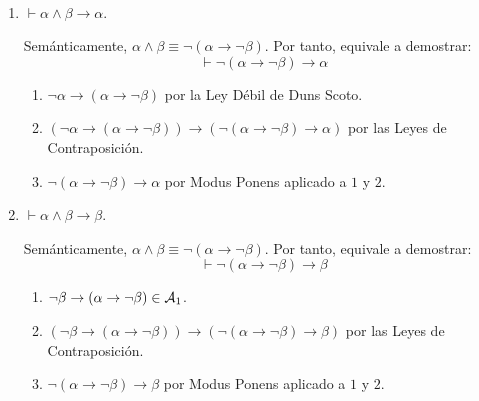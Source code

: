 \begin{ejercicio}\label{ej:1.22}~
    \begin{enumerate}
        \item $\vdash \alpha \land \beta \rightarrow \alpha$.
        
        Semánticamente, $\alpha\land\beta \equiv \neg(\alpha\rightarrow\neg\beta)$. Por tanto, equivale a demostrar:
        \begin{equation*}
            \vdash \neg(\alpha\rightarrow\neg\beta)\rightarrow\alpha
        \end{equation*}
        \begin{enumerate}[label=\arabic*.]
            \item $\neg\alpha\rightarrow (\alpha\rightarrow\neg\beta)$ por la Ley Débil de Duns Scoto.
            \item $\left(\neg\alpha\rightarrow (\alpha\rightarrow\neg\beta)\right)\rightarrow \left(\neg(\alpha\rightarrow\neg\beta)\rightarrow \alpha\right)$ por las Leyes de Contraposición.
            \item $\neg(\alpha\rightarrow\neg\beta)\rightarrow \alpha$ por Modus Ponens aplicado a $1$ y $2$.
        \end{enumerate}
        \item $\vdash \alpha \land \beta \rightarrow \beta$.
        
        Semánticamente, $\alpha\land\beta \equiv \neg(\alpha\rightarrow\neg\beta)$. Por tanto, equivale a demostrar:
        \begin{equation*}
            \vdash \neg(\alpha\rightarrow\neg\beta)\rightarrow\beta
        \end{equation*}
        \begin{enumerate}[label=\arabic*.]
            \item $\neg\beta\rightarrow (\alpha\rightarrow\neg\beta)\in \mathcal{A}_1$.
            \item $\left(\neg\beta\rightarrow (\alpha\rightarrow\neg\beta)\right)\rightarrow \left(\neg(\alpha\rightarrow\neg\beta)\rightarrow \beta\right)$ por las Leyes de Contraposición.
            \item $\neg(\alpha\rightarrow\neg\beta)\rightarrow \beta$ por Modus Ponens aplicado a $1$ y $2$.
        \end{enumerate}

    \end{enumerate}
\end{ejercicio}

